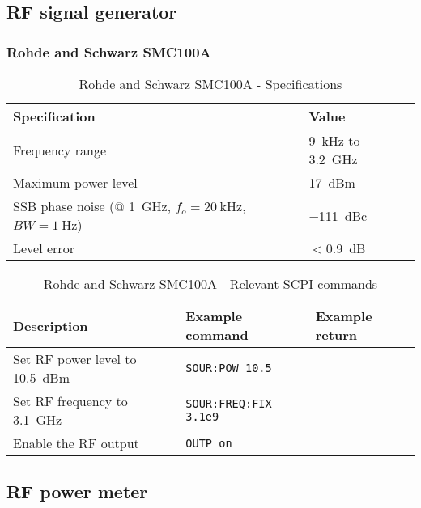 \subsection{RF signal generator}
\subsubsection{Rohde and Schwarz SMC100A}\label{app:smc}
\begin{table}[H]
	\centering
	\caption{Rohde and Schwarz SMC100A - Specifications}
	\label{tab:rs-smc100a-specs}
	\begin{tabularx}{\textwidth}{ll}
		\toprule
		\textbf{Specification} & \textbf{Value}\\
		\midrule
		Frequency range & \SI{9}{\kHz} to \SI{3.2}{\GHz}\\
		Maximum power level & \SI{17}{dBm}\\
		SSB phase noise (@ \SI{1}{\GHz}, $f_o=\SI{20}{\kHz}$, $BW=\SI{1}{\Hz}$) & \SI{-111}{dBc}\\
		Level error & $<$\SI{0.9}{\dB}\\
		\bottomrule
	\end{tabularx}
\end{table}

\begin{table}[H]
	\centering
	\caption{Rohde and Schwarz SMC100A - Relevant SCPI commands}
	\label{tab:rs-smc100a-scpi}
	\begin{tabularx}{\textwidth}{Xll}
		\toprule
		\textbf{Description} & \textbf{Example command} & \textbf{Example return}\\
		\midrule
		Set RF power level to \SI{10.5}{dBm} & \texttt{SOUR:POW 10.5} & \\
		Set RF frequency to \SI{3.1}{\GHz}& \texttt{SOUR:FREQ:FIX {3.1e9}} & \\
		Enable the RF output & \texttt{OUTP on} & \\
		\bottomrule
	\end{tabularx}
\end{table}

\subsection{RF power meter}
